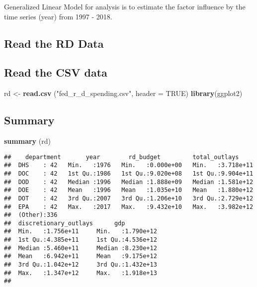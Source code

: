 \documentclass[]{article}
\newenvironment{Shaded}{\begin{snugshade}}{\end{snugshade}}
\newcommand{\KeywordTok}[1]{\textcolor[rgb]{0.13,0.29,0.53}{\textbf{#1}}}
\newcommand{\DataTypeTok}[1]{\textcolor[rgb]{0.13,0.29,0.53}{#1}}
\newcommand{\StringTok}[1]{\textcolor[rgb]{0.31,0.60,0.02}{#1}}
\newcommand{\OtherTok}[1]{\textcolor[rgb]{0.56,0.35,0.01}{#1}}
\newcommand{\NormalTok}[1]{#1}
\begin{document}
Generalized Linear Model for analysis is to estimate the factor
influence by the time series (year) from 1997 - 2018.

\subsection{Read the RD Data}\label{read-the-rd-data}

\subsection{Read the CSV data}\label{read-the-csv-data-1}

\begin{Shaded}
\begin{Highlighting}[]
\NormalTok{rd <-}\StringTok{ }\KeywordTok{read.csv}\NormalTok{ (}\StringTok{"fed_r_d_spending.csv"}\NormalTok{, }\DataTypeTok{header =} \OtherTok{TRUE}\NormalTok{)}
\KeywordTok{library}\NormalTok{(ggplot2)}
\end{Highlighting}
\end{Shaded}

\subsection{Summary}\label{summary-2}

\begin{Shaded}
\begin{Highlighting}[]
\KeywordTok{summary}\NormalTok{ (rd)}
\end{Highlighting}
\end{Shaded}

\begin{verbatim}
##    department       year        rd_budget         total_outlays      
##  DHS    : 42   Min.   :1976   Min.   :0.000e+00   Min.   :3.718e+11  
##  DOC    : 42   1st Qu.:1986   1st Qu.:9.020e+08   1st Qu.:9.904e+11  
##  DOD    : 42   Median :1996   Median :1.888e+09   Median :1.581e+12  
##  DOE    : 42   Mean   :1996   Mean   :1.035e+10   Mean   :1.880e+12  
##  DOT    : 42   3rd Qu.:2007   3rd Qu.:1.206e+10   3rd Qu.:2.729e+12  
##  EPA    : 42   Max.   :2017   Max.   :9.432e+10   Max.   :3.982e+12  
##  (Other):336                                                         
##  discretionary_outlays      gdp           
##  Min.   :1.756e+11     Min.   :1.790e+12  
##  1st Qu.:4.385e+11     1st Qu.:4.536e+12  
##  Median :5.460e+11     Median :8.230e+12  
##  Mean   :6.942e+11     Mean   :9.175e+12  
##  3rd Qu.:1.042e+12     3rd Qu.:1.432e+13  
##  Max.   :1.347e+12     Max.   :1.918e+13  
## 
\end{verbatim}
\end{document}
